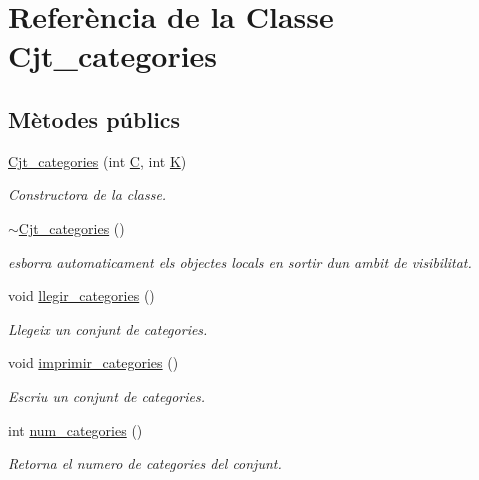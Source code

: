 \hypertarget{class_cjt__categories}{}\section{Referència de la Classe Cjt\+\_\+categories}
\label{class_cjt__categories}
\subsection*{Mètodes públics}
\begin{DoxyCompactItemize}
\item 
\mbox{\hyperlink{class_cjt__categories_a0a7b9eae526afdb8c18269fefcee1174}{Cjt\+\_\+categories}} (int \mbox{\hyperlink{class_cjt__categories_a1d3d6eb2bd5a981ca1e56d4d16e7d1c1}{C}}, int \mbox{\hyperlink{class_cjt__categories_a3e7981c4f9b0aa3e0d5999ffa291ce54}{K}})
\begin{DoxyCompactList}\small\item\em Constructora de la classe. \end{DoxyCompactList}\item 
\mbox{\hyperlink{class_cjt__categories_a768f340b8389161d8dc565ecf8853f4f}{$\sim$\+Cjt\+\_\+categories}} ()
\begin{DoxyCompactList}\small\item\em esborra automaticament els objectes locals en sortir d\textquotesingle{}un ambit de visibilitat. \end{DoxyCompactList}\item 
void \mbox{\hyperlink{class_cjt__categories_aec7c99f38b0e4a59e804b5bf9ed1a4c8}{llegir\+\_\+categories}} ()
\begin{DoxyCompactList}\small\item\em Llegeix un conjunt de categories. \end{DoxyCompactList}\item 
void \mbox{\hyperlink{class_cjt__categories_ad1a67d725173663782d1385ff59f0be6}{imprimir\+\_\+categories}} ()
\begin{DoxyCompactList}\small\item\em Escriu un conjunt de categories. \end{DoxyCompactList}\item 
int \mbox{\hyperlink{class_cjt__categories_a78445bc84e521a95e7314ec4ac2565ad}{num\+\_\+categories}} ()
\begin{DoxyCompactList}\small\item\em Retorna el numero de categories del conjunt. \end{DoxyCompactList}\end{DoxyCompactItemize}

